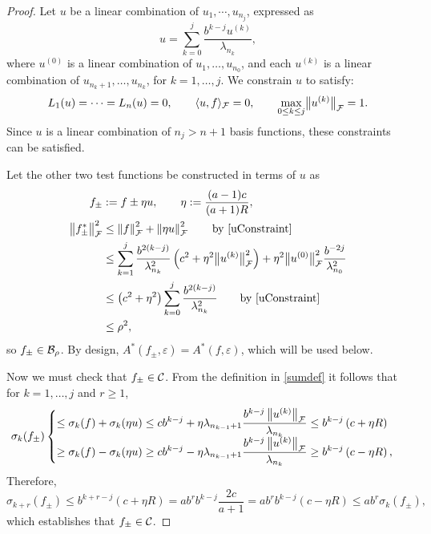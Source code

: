 \documentclass[graybox,footinfo]{svmult}
\newcommand{\DHJRnorm}[2][{}]{\ensuremath{\left \lVert #2 \right \rVert}_{#1}}
\newcommand{\DHJRbignorm}[2][{}]{\ensuremath{\bigl \lVert #2 \bigr \rVert}_{#1}}
\begin{document}
\begin{proof}
Let $u$ be a linear combination of $u_1, \cdots, u_{n_j}$, expressed as
\[
u =  \sum_{k=0}^{j}\frac{b^{k-j}u^{(k)}}{\lambda_{n_k}},
\]
where $u^{(0)}$ is a linear combination of $u_{1}, \ldots, u_{n_0}$, and each $u^{(k)}$ is a linear combination of $u_{n_k+1}, \ldots, u_{n_k}$, for $k =1, \ldots, j$.  We constrain $u$ to satisfy:
\begin{equation}\label{uConstraint}
L_1(u) = \cdots = L_n(u) = 0, \qquad \langle u,f \rangle_{\calF} = 0, \qquad 
\max_{0\le k\le j} \DHJRbignorm[\calF]{u^{(k)}} = 1.
\end{equation}
Since $u$ is a linear combination of $n_j >n+1$ basis functions, these constraints can be satisfied.

Let the other two test functions be constructed in terms of $u$ as 
\begin{align}
\label{etadef}
f_\pm & := f \pm \eta u, \qquad \eta : =  \frac {(a-1)c}{(a+1)R}, \\
\nonumber
\DHJRnorm[\calF]{f^*_\pm}^2 & \le \DHJRnorm[\calF]{f}^2 + \DHJRnorm[\calF]{\eta u }^2 \qquad \text{by \eqref{uConstraint}} \\
& \le \sum_{k=1}^j \frac{ b^{2(k-j)}}{\lambda^2_{n_{k}}} \left(c^2+ \eta^2 \DHJRbignorm[\calF]{u^{(k)}}^2\right) + \eta^2 \DHJRbignorm[\calF]{u^{(0)}}^2 \frac{b^{-2j}}{\lambda_{n_0}^2}\\
\nonumber
& \le  \left(c^2+ \eta^2 \right) \sum_{k=0}^j \frac{ b^{2(k-j)}}{\lambda^2_{n_{k}}}  \qquad \text{by \eqref{uConstraint}}\\
&  \le \rho^2,
\end{align} 
so $f_{\pm} \in {\mathcal{B}}_{\rho}$.  By design, $A^*(f_\pm,\varepsilon) = A^*(f,\varepsilon)$, which will be used below.

Now we must check that $f_\pm \in {\mathcal{C}}$. From the definition in \eqref{sumdef} it follows that for $k = 1, \ldots, j$ and $r \ge 1$,
\begin{equation*}
\sigma_k(f_\pm)  \begin{cases} 
\displaystyle
\le \sigma_k(f) + \sigma_k(\eta u)\le 
c b^{k-j} + \eta\lambda_{n_{k-1}+1}\frac{b^{k-j}\DHJRnorm[\calF]{u^{(k)} } }{\lambda_{n_k}}
\le b^{k-j}\left(c+\eta R \right) 
\\[1ex]
\displaystyle
\ge \sigma_k(f) - \sigma_k(\eta u)\ge 
c b^{k-j} - \eta\lambda_{n_{k-1}+1}\frac{b^{k-j}\DHJRnorm[\calF]{u^{(k)} } }{\lambda_{n_k}}
\ge b^{k-j}\left(c-\eta R \right) , 
\end{cases}
\end{equation*}
Therefore, 
\begin{equation*}
\sigma_{k+r}(f_\pm)
\le b^{k+r-j}(c+\eta R) = ab^r b^{k-j}\frac{2c}{a+1}
=ab^r b^{k-j}\left(c-\eta R \right) \le a b^r \sigma_{k}(f_\pm),
\end{equation*}
which establishes that $f_\pm \in {\mathcal{C}}$.


\end{proof}
\end{document}
